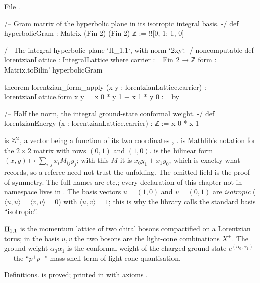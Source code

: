 \noindent File .
\begin{leancode}
/-- Gram matrix of the hyperbolic plane in its isotropic integral basis. -/
def hyperbolicGram : Matrix (Fin 2) (Fin 2) ℤ := !![0, 1; 1, 0]

/-- The integral hyperbolic plane `II_{1,1}`, with norm `2xy`. -/
noncomputable def lorentzianLattice : IntegralLattice where
  carrier := Fin 2 → ℤ
  form := Matrix.toBilin' hyperbolicGram

theorem lorentzian_form_apply (x y : lorentzianLattice.carrier) :
    lorentzianLattice.form x y = x 0 * y 1 + x 1 * y 0 := by

/-- Half the norm, the integral ground-state conformal weight. -/
def lorentzianEnergy (x : lorentzianLattice.carrier) : ℤ := x 0 * x 1
\end{leancode}

\begin{dictionary}
 is ${\mathbb{Z}}^2$, a vector being a function of its two coordinates , .
\chseventeenL{!![0, 1; 1, 0]} is Mathlib's notation for the $2\times2$ matrix with rows $(0,1)$ and $(1,0)$.
 is the bilinear form $(x,y)\mapsto\sum_{i,j}x_iM_{ij}y_j$; with this $M$ it is
$x_0y_1+x_1y_0$, which is exactly what  records, so a referee need not trust
the unfolding.  The omitted field  is the proof of symmetry.  The full names are
 etc.; every declaration of this chapter not in
namespace  lives in .  The basis vectors $u=(1,0)$ and
$v=(0,1)$ are \emph{isotropic} ($\langle u,u\rangle=\langle v,v\rangle=0$) with $\langle u,v\rangle=1$; this is
why the library calls the standard basis ``isotropic''.
\end{dictionary}

\begin{physics}
${\mathrm{II}_{1,1}}$ is the momentum lattice of two chiral bosons compactified on a Lorentzian torus; in the
basis $u,v$ the two bosons are the light-cone combinations $X^\pm$.  The ground weight $\alpha_0\alpha_1$ is the conformal
weight of the charged ground state $e^{(\alpha_0,\alpha_1)}$ --- the ``$p^+p^-$'' mass-shell term of light-cone
quantisation.
\end{physics}

\begin{status}
Definitions.   is proved; printed in
 with axioms .
\end{status}

